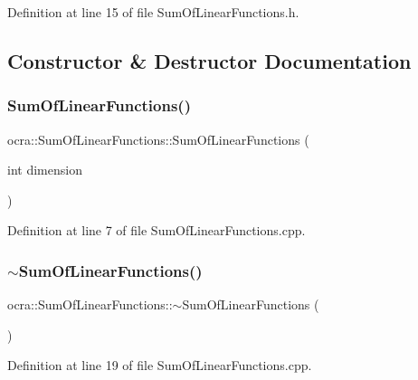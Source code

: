 Definition at line 15 of file Sum\+Of\+Linear\+Functions.\+h.



\subsection{Constructor \& Destructor Documentation}
\hypertarget{classocra_1_1SumOfLinearFunctions_a70b277cb77618691688b7b6151ec126d}{}\label{classocra_1_1SumOfLinearFunctions_a70b277cb77618691688b7b6151ec126d} 
\subsubsection{\texorpdfstring{Sum\+Of\+Linear\+Functions()}{SumOfLinearFunctions()}}
{\footnotesize\ttfamily ocra\+::\+Sum\+Of\+Linear\+Functions\+::\+Sum\+Of\+Linear\+Functions (\begin{DoxyParamCaption}\item[{int}]{dimension }\end{DoxyParamCaption})}



Definition at line 7 of file Sum\+Of\+Linear\+Functions.\+cpp.

\hypertarget{classocra_1_1SumOfLinearFunctions_a0ca0f87d5eee6117cd521130a831d90e}{}\label{classocra_1_1SumOfLinearFunctions_a0ca0f87d5eee6117cd521130a831d90e} 
\subsubsection{\texorpdfstring{$\sim$\+Sum\+Of\+Linear\+Functions()}{~SumOfLinearFunctions()}}
{\footnotesize\ttfamily ocra\+::\+Sum\+Of\+Linear\+Functions\+::$\sim$\+Sum\+Of\+Linear\+Functions (\begin{DoxyParamCaption}{ }\end{DoxyParamCaption})}



Definition at line 19 of file Sum\+Of\+Linear\+Functions.\+cpp.



